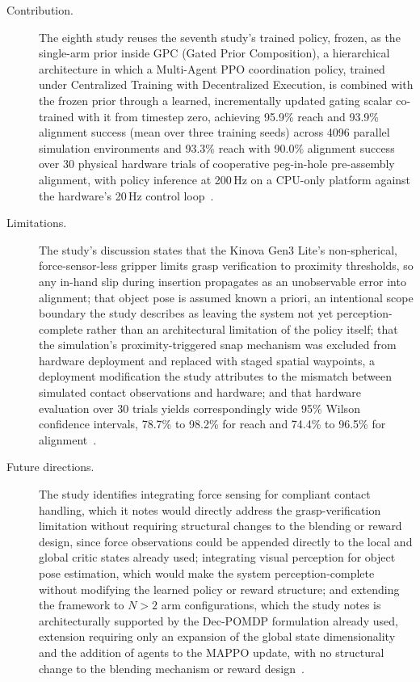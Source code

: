 \begin{description}
    \item[Contribution.] The eighth study reuses the seventh study's trained policy, frozen, as the
    single-arm prior inside GPC (Gated Prior Composition), a hierarchical architecture in which a
    Multi-Agent PPO coordination policy, trained under Centralized Training with Decentralized
    Execution, is combined with the frozen prior through a learned, incrementally updated gating
    scalar co-trained with it from timestep zero, achieving 95.9\% reach and 93.9\% alignment success
    (mean over three training seeds) across 4096 parallel simulation environments and 93.3\% reach with 90.0\% alignment success over
    30 physical hardware trials of cooperative peg-in-hole pre-assembly alignment, with policy
    inference at 200\,Hz on a CPU-only platform against the hardware's 20\,Hz control
    loop~\citep{sk2026priorguided}.

    \item[Limitations.] The study's discussion states that the Kinova Gen3 Lite's non-spherical,
    force-sensor-less gripper limits grasp verification to proximity thresholds, so any in-hand slip
    during insertion propagates as an unobservable error into alignment; that object pose is assumed
    known a priori, an intentional scope boundary the study describes as leaving the system not yet
    perception-complete rather than an architectural limitation of the policy itself; that the
    simulation's proximity-triggered snap mechanism was excluded from hardware deployment and
    replaced with staged spatial waypoints, a deployment modification the study attributes to the
    mismatch between simulated contact observations and hardware; and that hardware evaluation over
    30 trials yields correspondingly wide 95\% Wilson confidence intervals, 78.7\% to 98.2\% for
    reach and 74.4\% to 96.5\% for alignment~\citep{sk2026priorguided}.

    \item[Future directions.] The study identifies integrating force sensing for compliant contact
    handling, which it notes would directly address the grasp-verification limitation without
    requiring structural changes to the blending or reward design, since force observations could be
    appended directly to the local and global critic states already used; integrating visual
    perception for object pose estimation, which would make the system perception-complete without
    modifying the learned policy or reward structure; and extending the framework to $N>2$ arm
    configurations, which the study notes is architecturally supported by the Dec-POMDP formulation
    already used, extension requiring only an expansion of the global state dimensionality and the
    addition of agents to the MAPPO update, with no structural change to the blending mechanism or
    reward design~\citep{sk2026priorguided}.
\end{description}

